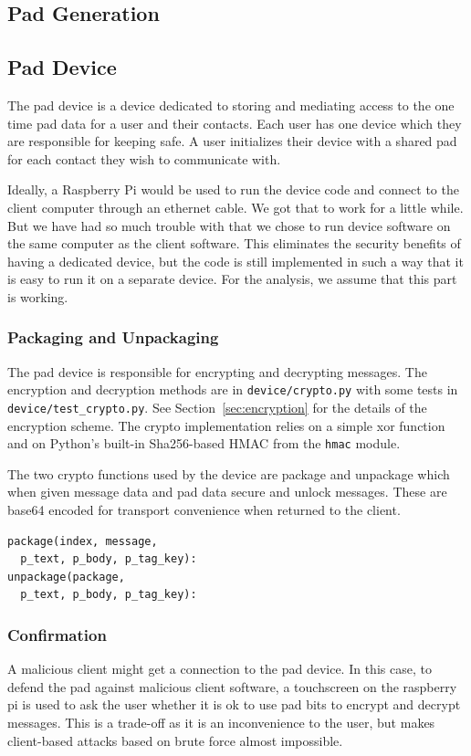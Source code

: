 \documentclass[twocolumn]{article}
\begin{document}


\subsection{Pad Generation}


\subsection{Pad Device}
The pad device is a device dedicated to storing and mediating access to the one time pad data for a user and their contacts. Each user has one device which they are responsible for keeping safe. A user initializes their device with a shared pad for each contact they wish to communicate with.

Ideally, a Raspberry Pi would be used to run the device code and connect to the client computer through an ethernet cable. We got that to work for a little while. But we have had so much trouble with that we chose to run device software on the same computer as the client software. This eliminates the security benefits of having a dedicated device, but the code is still implemented in such a way that it is easy to run it on a separate device. For the analysis, we assume that this part is working.


\subsubsection{Packaging and Unpackaging}
The pad device is responsible for encrypting and decrypting messages. The encryption and decryption methods are in \texttt{device/crypto.py} with some tests in \texttt{device/test\_crypto.py}. See Section~\ref{sec:encryption} for the details of the encryption scheme. The crypto implementation relies on a simple xor function and on Python's built-in Sha256-based HMAC from the \texttt{hmac} module.

The two crypto functions used by the device are package and unpackage which when given message
data and pad data secure and unlock messages. These are base64 encoded for transport convenience when
returned to the client.

\begin{lstlisting}
package(index, message,
  p_text, p_body, p_tag_key):
unpackage(package,
  p_text, p_body, p_tag_key):
\end{lstlisting}

\subsubsection{Confirmation}
A malicious client might get a connection to the pad device. In this case, to defend the pad against malicious client software, a touchscreen on the raspberry pi is used to ask the user whether it is ok to use pad bits to encrypt and decrypt messages. This is a trade-off as it is an inconvenience to the user, but makes client-based attacks based on brute force almost impossible.
\end{document}
